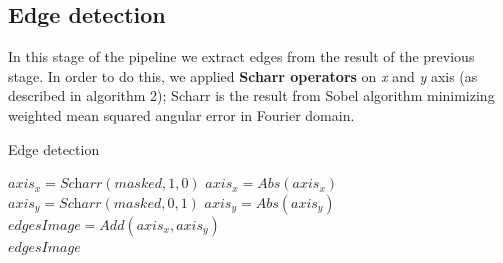 \documentclass[journal]{IEEEtran}
\begin{document}
\subsection{Edge detection}
In this stage of the pipeline we extract edges from the result of the previous stage. In order to do this, we applied \textbf{Scharr operators} on \textit{x} and \textit{y} axis (as described in algorithm 2); Scharr is the result from Sobel algorithm minimizing weighted mean squared angular error in Fourier domain.
\begin{algorithm}
\caption{Edge detection}
\begin{algorithmic}[1]
\State $axis_x   = \textit{Scharr}(masked, 1, 0)$
\State $axis_x   = \textit{Abs}(axis_x)$
\State $axis_y   = \textit{Scharr}(masked, 0, 1)$
\State $axis_y   = \textit{Abs}(axis_y)$
\State $edgesImage   = \textit{Add}(axis_x, axis_y)$ \\
\Return $edgesImage$
\end{algorithmic}
\end{algorithm}
\\
\\
\end{document}
